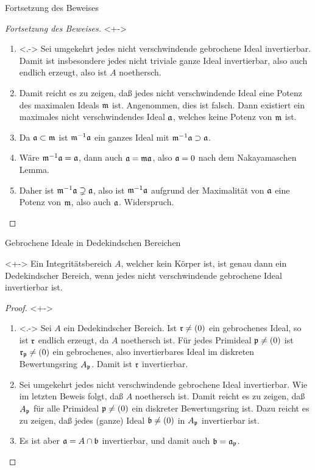 \begin{frame}{Fortsetzung des Beweises}
	\begin{proof}[Fortsetzung des Beweises]<+->
		\begin{enumerate}[<+->]
		\item<.->
			Sei umgekehrt jedes nicht verschwindende gebrochene Ideal
			invertierbar. Damit ist insbesondere jedes nicht triviale ganze Ideal
			invertierbar, also auch endlich erzeugt, also ist \(A\) noethersch.
		\item
			Damit reicht es zu zeigen, daß jedes nicht verschwindende Ideal
			eine Potenz des maximalen Ideals \(\mathfrak{m}\) ist. Angenommen, dies ist falsch.
			Dann existiert ein maximales nicht verschwindendes Ideal \(\mathfrak{a}\),
			welches keine Potenz von \(\mathfrak{m}\) ist.
		\item
			Da \(\mathfrak{a} \subset \mathfrak{m}\) ist \(\mathfrak{m}^{-1} \mathfrak{a}\) ein
			ganzes Ideal mit \(\mathfrak{m}^{-1} \mathfrak{a} \supset \mathfrak{a}\).
		\item
			Wäre \(\mathfrak{m}^{-1} \mathfrak{a} = \mathfrak{a}\), dann auch \(\mathfrak{a} = \mathfrak{m} \mathfrak{a}\),
			also \(\mathfrak{a} = 0\) nach dem Nakayamaschen Lemma.
		\item
			Daher ist \(\mathfrak{m}^{-1} \mathfrak{a} \supsetneq \mathfrak{a}\), also ist
			\(\mathfrak{m}^{-1} \mathfrak{a}\) aufgrund der Maximalität von \(\mathfrak{a}\)
			eine Potenz von \(\mathfrak{m}\), also auch \(\mathfrak{a}\). Widerspruch.
			\qedhere
		\end{enumerate}
	\end{proof}
\end{frame}

\begin{frame}{Gebrochene Ideale in Dedekindschen Bereichen}
	\begin{theorem}<+->
		Ein Integritätsbereich \(A\), welcher kein Körper ist, ist genau
		dann ein Dedekindscher Bereich, wenn jedes nicht verschwindende
		gebrochene Ideal invertierbar ist.
	\end{theorem}
	\begin{proof}<+->
		\begin{enumerate}[<+->]
		\item<.->
			Sei \(A\) ein Dedekindscher Bereich. Ist \(\mathfrak{r} \neq (0)\) ein
			gebrochenes Ideal, so ist \(\mathfrak{r}\) endlich erzeugt, da
			\(A\) noethersch ist. Für jedes Primideal \(\mathfrak{p} \neq (0)\) ist
			\(\mathfrak{r}_{\mathfrak{p}} \neq (0)\) ein gebrochenes, also invertierbares
			Ideal im diskreten Bewertungsring \(A_{\mathfrak{p}}\). Damit ist
			\(\mathfrak{r}\) invertierbar.
		\item
			Sei umgekehrt jedes nicht verschwindende gebrochene Ideal invertierbar.
			Wie im letzten Beweis folgt, daß \(A\) noethersch ist. Damit reicht es
			zu zeigen, daß \(A_{\mathfrak{p}}\) für alle Primideal \(\mathfrak{p} \neq (0)\)
			ein diskreter Bewertungsring ist. Dazu reicht es zu zeigen, daß
			jedes (ganze) Ideal \(\mathfrak{b} \neq (0)\) in \(A_{\mathfrak{p}}\)
			invertierbar ist.
		\item
			Es ist aber \(\mathfrak{a} = A \cap \mathfrak{b}\) invertierbar, und damit
			auch \(\mathfrak{b} = \mathfrak{a}_{\mathfrak{p}}\).
			\qedhere
		\end{enumerate}
	\end{proof}
\end{frame}

